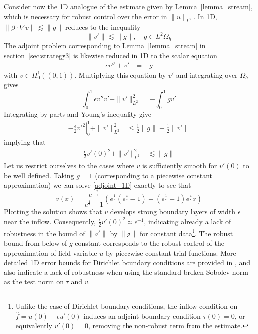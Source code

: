 \documentclass[11pt,onecolumn]{scrartcl}
\newcommand{\grad}{\nabla}
\begin{document}
Consider now the 1D analogue of the estimate given by Lemma~\ref{lemma_stream}, which is necessary for robust control over the error in $\|u\|_{L^2}$.  In 1D, $\|\beta\cdot\grad v\| \lesssim \|g\|$ reduces to the inequality 
\[
\|v'\|\lesssim \|g\|, \quad g\in L^2{\Omega_h}
\]
The adjoint problem corresponding to Lemma~\ref{lemma_stream} in section~\ref{sec:strategy3} is likewise reduced in 1D to the scalar equation
\begin{align}
\epsilon v'' + v' &= -g \label{adjoint_1D}
\end{align}
with $v\in H^1_0\left((0,1)\right)$.  Multiplying this equation by $v'$ and integrating over $\Omega_h$ gives
\[
\int_0^1 \epsilon v''v' + \|v'\|_{L^2}^2 = -\int_0^1 g v'
\]
Integrating by parts and Young's inequality give
\begin{align*}
-\left.\frac{\epsilon}{2} v'^2\right|_0^1 + \|v'\|_{L^2}^2 &\leq \frac{1}{2}\|g\| + \frac{1}{2}\|v'\|
\end{align*}
implying that
\begin{align*}
\frac{\epsilon}{2} v'(0)^2 + \|v'\|_{L^2}^2 & \lesssim \|g\| 
\end{align*}
Let us restrict ourselves to the cases where $v$ is sufficiently smooth for $v'(0)$ to be well defined.  Taking $g=1$ (corresponding to a piecewise constant approximation) we can solve \eqref{adjoint_1D} exactly to see that 
\[
v(x) = \frac{e^{-\frac{x}{\epsilon}}}{e^{\frac{1}{\epsilon}}-1}\left(e^{\frac{1}{\epsilon}}\left(e^{\frac{x}{\epsilon}}-1\right) + \left(e^{\frac{1}{\epsilon}}-1\right)e^{\frac{x}{\epsilon}}x\right)
\]
Plotting the solution shows that $v$ develops strong boundary layers of width $\epsilon$ near the inflow. Consequently, $\frac{\epsilon}{2} v'(0)^2 \approx \epsilon^{-1}$, indicating already a lack of robustness in the bound of $\|v'\|$ by $\|g\|$ for constant data\footnote{Unlike the case of Dirichlet boundary conditions, the inflow condition on $ \widehat{f} = u(0)-\epsilon u'(0)$ induces an adjoint boundary condition $\tau(0)=0$, or equivalently $v'(0) = 0$, removing the non-robust term from the estimate.}. The robust bound from below of $g$ constant corresponds to the robust control of the approximation of field variable $u$ by piecewise constant trial functions. More detailed 1D error bounds for Dirichlet boundary conditions are provided in \cite{DPG3}, and also indicate a lack of robustness when using the standard broken Sobolev norm as the test norm on $\tau$ and $v$. 
\end{document}
